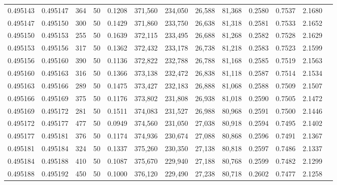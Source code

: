 \begin{tabular}{rrrrrrrrrrrrr}
0.495143 & 0.495147 &   364 &  50 &                                     0.1208 & 371,560 & 234,050 &  26,588 &  81,368 & 0.2580 & 0.7537 & 2.1680 \\
0.495147 & 0.495150 &   300 &  50 &                                     0.1429 & 371,860 & 233,750 &  26,638 &  81,318 & 0.2581 & 0.7533 & 2.1652 \\
0.495150 & 0.495153 &   255 &  50 &                                     0.1639 & 372,115 & 233,495 &  26,688 &  81,268 & 0.2582 & 0.7528 & 2.1629 \\
0.495153 & 0.495156 &   317 &  50 &                                     0.1362 & 372,432 & 233,178 &  26,738 &  81,218 & 0.2583 & 0.7523 & 2.1599 \\
0.495156 & 0.495160 &   390 &  50 &                                     0.1136 & 372,822 & 232,788 &  26,788 &  81,168 & 0.2585 & 0.7519 & 2.1563 \\
0.495160 & 0.495163 &   316 &  50 &                                     0.1366 & 373,138 & 232,472 &  26,838 &  81,118 & 0.2587 & 0.7514 & 2.1534 \\
0.495163 & 0.495166 &   289 &  50 &                                     0.1475 & 373,427 & 232,183 &  26,888 &  81,068 & 0.2588 & 0.7509 & 2.1507 \\
0.495166 & 0.495169 &   375 &  50 &                                     0.1176 & 373,802 & 231,808 &  26,938 &  81,018 & 0.2590 & 0.7505 & 2.1472 \\
0.495169 & 0.495172 &   281 &  50 &                                     0.1511 & 374,083 & 231,527 &  26,988 &  80,968 & 0.2591 & 0.7500 & 2.1446 \\
0.495172 & 0.495177 &   477 &  50 &                                     0.0949 & 374,560 & 231,050 &  27,038 &  80,918 & 0.2594 & 0.7495 & 2.1402 \\
0.495177 & 0.495181 &   376 &  50 &                                     0.1174 & 374,936 & 230,674 &  27,088 &  80,868 & 0.2596 & 0.7491 & 2.1367 \\
0.495181 & 0.495184 &   324 &  50 &                                     0.1337 & 375,260 & 230,350 &  27,138 &  80,818 & 0.2597 & 0.7486 & 2.1337 \\
0.495184 & 0.495188 &   410 &  50 &                                     0.1087 & 375,670 & 229,940 &  27,188 &  80,768 & 0.2599 & 0.7482 & 2.1299 \\
0.495188 & 0.495192 &   450 &  50 &                                     0.1000 & 376,120 & 229,490 &  27,238 &  80,718 & 0.2602 & 0.7477 & 2.1258 \\

\end{tabular}
